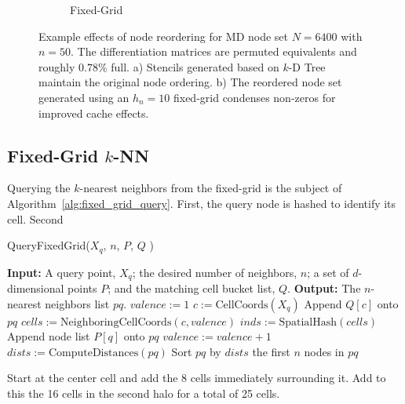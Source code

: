 \documentclass{report}
\begin{document}
\begin{figure}
\begin{subfigure}{0.425\textwidth}
\caption{Fixed-Grid}
\end{subfigure}
\caption{Example effects of node reordering for MD node set $N=6400$ with $n=50$. The differentiation matrices are permuted equivalents and roughly $0.78\%$ full. a) Stencils generated based on $k$-D Tree maintain the original node ordering. b) The reordered node set generated using an $h_n=10$ fixed-grid condenses non-zeros for improved cache effects.}
\label{fig:reorder_example}
\end{figure} 

\subsection{Fixed-Grid $k$-NN}

Querying the $k$-nearest neighbors from the fixed-grid is the subject of Algorithm~\ref{alg:fixed_grid_query}. First, the query node is hashed to identify its cell. Second 

\begin{algorithm} 
\caption{QueryFixedGrid($X_q$, $n$, $P$, $Q$ )}         
\label{alg:fixed_grid_query}  
\begin{algorithmic}[1]    
    \State \textbf{Input:} A query point, $X_q$; the desired number of neighbors, $n$; a set of $d$-dimensional points $P$; and the matching cell bucket list, $Q$.
    \State \textbf{Output:} The $n$-nearest neighbors list $pq$.
    \State     
    \State $valence := 1$
    \State $c := \text{CellCoords}(X_q)$ 
    \State Append $Q[c]$ onto $pq$
        \State $cells := \text{NeighboringCellCoords}(c, valence)$
        \State $inds := \text{SpatialHash}(cells)$
            \State Append node list $P[q]$ onto $pq$
            \EndIf
        \EndFor
        \State $valence := valence + 1$
    \EndWhile
    \State $dists := \text{ComputeDistances}(pq)$
    \State Sort $pq$ by $dists$
    \State \Return the first $n$ nodes in $pq$
    \end{algorithmic}
\end{algorithm}




Start at the center cell and add the 8 cells immediately surrounding it. Add to this the 16 cells in the second halo for a total of 25 cells. 
\end{document}
